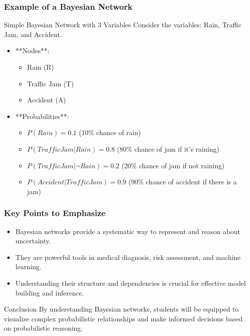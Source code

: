 \documentclass[aspectratio=169]{beamer}
\begin{document}
\begin{frame}[fragile]
    \frametitle{Example of a Bayesian Network}

    \begin{block}{Simple Bayesian Network with 3 Variables}
        Consider the variables: Rain, Traffic Jam, and Accident.
    \end{block}
    
    \begin{itemize}
        \item **Nodes**: 
            \begin{itemize}
                \item Rain (R)
                \item Traffic Jam (T)
                \item Accident (A)
            \end{itemize}
        \item **Probabilities**:
            \begin{itemize}
                \item $P(Rain) = 0.1$ (10\% chance of rain)
                \item $P(Traffic Jam | Rain) = 0.8$ (80\% chance of jam if it’s raining)
                \item $P(Traffic Jam | \neg Rain) = 0.2$ (20\% chance of jam if not raining)
                \item $P(Accident | Traffic Jam) = 0.9$ (90\% chance of accident if there is a jam)
            \end{itemize}
    \end{itemize}
\end{frame}

\begin{frame}[fragile]
    \frametitle{Key Points to Emphasize}

    \begin{itemize}
        \item Bayesian networks provide a systematic way to represent and reason about uncertainty.
        \item They are powerful tools in medical diagnosis, risk assessment, and machine learning.
        \item Understanding their structure and dependencies is crucial for effective model building and inference.
    \end{itemize}
    
    \begin{block}{Conclusion}
        By understanding Bayesian networks, students will be equipped to visualize complex probabilistic relationships and make informed decisions based on probabilistic reasoning.
    \end{block}
\end{frame}
\end{document}
